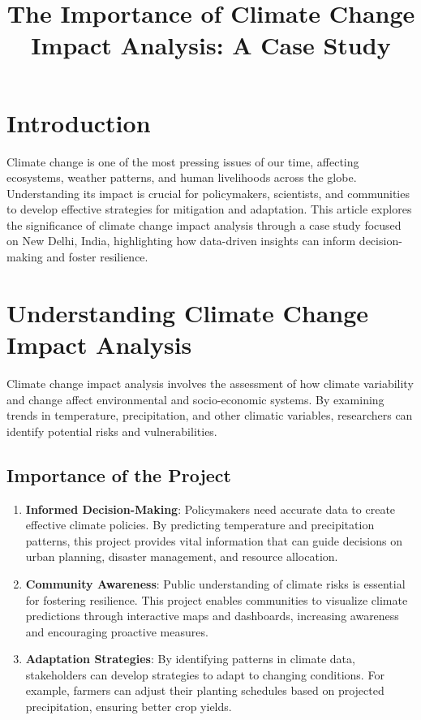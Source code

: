 \documentclass{article}
\title{\textbf{The Importance of Climate Change Impact Analysis: A Case Study}}
\author{}
\date{}
\begin{document}
\maketitle

\section{Introduction}

Climate change is one of the most pressing issues of our time, affecting ecosystems, weather patterns, and human livelihoods across the globe. Understanding its impact is crucial for policymakers, scientists, and communities to develop effective strategies for mitigation and adaptation. This article explores the significance of climate change impact analysis through a case study focused on New Delhi, India, highlighting how data-driven insights can inform decision-making and foster resilience.

\section{Understanding Climate Change Impact Analysis}

Climate change impact analysis involves the assessment of how climate variability and change affect environmental and socio-economic systems. By examining trends in temperature, precipitation, and other climatic variables, researchers can identify potential risks and vulnerabilities.

\subsection{Importance of the Project}

\begin{enumerate}
    \item \textbf{Informed Decision-Making}: Policymakers need accurate data to create effective climate policies. By predicting temperature and precipitation patterns, this project provides vital information that can guide decisions on urban planning, disaster management, and resource allocation.
    
    \item \textbf{Community Awareness}: Public understanding of climate risks is essential for fostering resilience. This project enables communities to visualize climate predictions through interactive maps and dashboards, increasing awareness and encouraging proactive measures.
    
    \item \textbf{Adaptation Strategies}: By identifying patterns in climate data, stakeholders can develop strategies to adapt to changing conditions. For example, farmers can adjust their planting schedules based on projected precipitation, ensuring better crop yields.
\end{enumerate}
\end{document}
